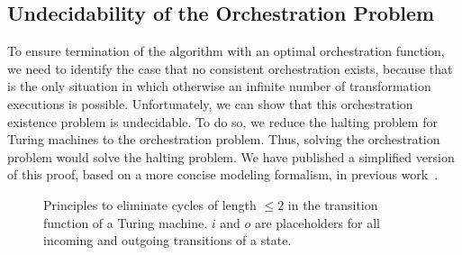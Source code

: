 



\subsection{Undecidability of the Orchestration Problem} %

To ensure termination of the  algorithm with an optimal orchestration function, we need to identify the case that no consistent orchestration exists, because that is the only situation in which otherwise an infinite number of transformation executions is possible.
Unfortunately, we can show that this orchestration existence problem is undecidable.
To do so, we reduce the halting problem for Turing machines to the orchestration problem.
Thus, solving the orchestration problem would solve the halting problem.
We have published a simplified version of this proof, based on a more concise modeling formalism, in previous work~.

\begin{figure}
    \centering
    
    \caption[Cycle elimination in Turing machine transition functions]{Principles to eliminate cycles of length $\leq 2$ in the transition function of a Turing machine. $i$ and $o$ are placeholders for all incoming and outgoing transitions of a state.}
    \label{fig:orchestration:cycle_elimination}
\end{figure}

